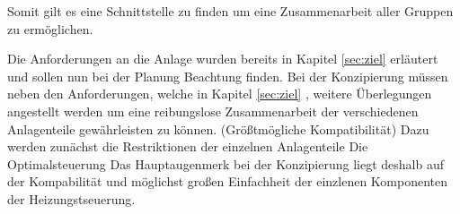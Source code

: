 Somit gilt es eine Schnittstelle zu finden um eine Zusammenarbeit aller Gruppen zu ermöglichen.

Die Anforderungen an die Anlage wurden bereits in Kapitel \ref{sec:ziel} erläutert und sollen nun bei der Planung Beachtung finden.
Bei der Konzipierung müssen neben den Anforderungen, welche in Kapitel \ref{sec:ziel} , weitere Überlegungen angestellt werden um eine reibungslose Zusammenarbeit der verschiedenen Anlagenteile gewährleisten zu können. (Größtmögliche Kompatibilität)
Dazu werden zunächst die Restriktionen der einzelnen Anlagenteile
Die Optimalsteuerung 
Das Hauptaugenmerk bei der Konzipierung liegt deshalb auf der Kompabilität und möglichst großen Einfachheit der einzlenen Komponenten der Heizungstseuerung. 
